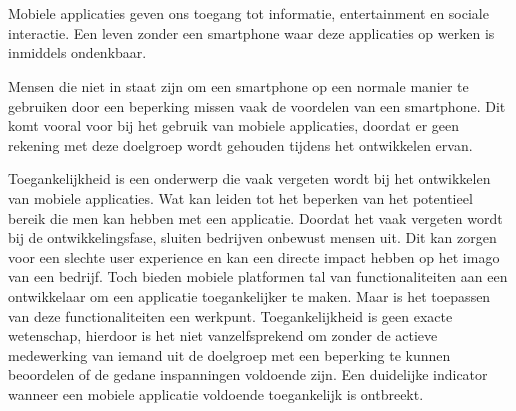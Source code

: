 
\chapter{}
\label{ch:inleiding}


\section{}
\label{sec:probleemstelling}
Mobiele applicaties geven ons toegang tot informatie, entertainment en sociale interactie. Een leven zonder een smartphone waar deze applicaties op werken is inmiddels ondenkbaar. 

Mensen die niet in staat zijn om een smartphone op een normale manier te gebruiken door een beperking missen vaak de voordelen van een smartphone. Dit komt vooral voor bij het gebruik van mobiele applicaties, doordat er geen rekening met deze doelgroep wordt gehouden tijdens het ontwikkelen ervan.

Toegankelijkheid is een onderwerp die vaak vergeten wordt bij het ontwikkelen van mobiele applicaties. Wat kan leiden tot het beperken van het potentieel bereik die men kan hebben met een applicatie.  Doordat het vaak vergeten wordt bij de ontwikkelingsfase, sluiten bedrijven onbewust mensen uit. Dit kan zorgen voor een slechte user experience en kan een directe impact hebben op het imago van een bedrijf. Toch bieden mobiele platformen tal van functionaliteiten aan een ontwikkelaar om een applicatie toegankelijker te maken. Maar is het toepassen van deze functionaliteiten een werkpunt. Toegankelijkheid is geen exacte wetenschap, hierdoor is het niet vanzelfsprekend om zonder de actieve medewerking van iemand uit de doelgroep met een beperking te kunnen beoordelen of de gedane inspanningen voldoende zijn. Een duidelijke indicator wanneer een mobiele applicatie voldoende toegankelijk is ontbreekt. 

